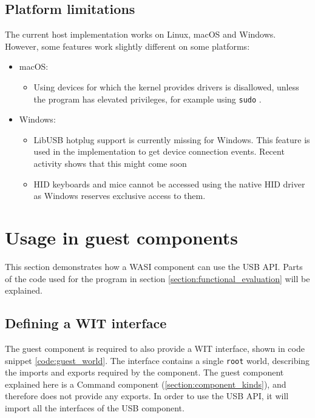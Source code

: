 \subsection{Platform limitations}
\label{section:platform_limitations}
The current host implementation works on Linux, macOS and Windows. However, some features work slightly different on some platforms:

\begin{itemize}
\item macOS: 
\begin{itemize}
\item Using devices for which the kernel provides drivers is disallowed, unless the program has elevated privileges, for example using \texttt{sudo} \cite{libusb_macos_limitations}.
\end{itemize}

\item Windows:
\begin{itemize}
\item LibUSB hotplug support is currently missing for Windows. This feature is used in the implementation to get device connection events. Recent activity shows that this might come soon \cite{libusb_hotplug_support}
\item HID keyboards and mice cannot be accessed using the native HID driver as Windows reserves exclusive access to them. \cite{libusb_windows_limitations}
\end{itemize}
\end{itemize}

\section{Usage in guest components}
This section demonstrates how a \acrshort{WASI} component can use the \acrshort{USB} \acrshort{API}. Parts of the code used for the program in section \ref{section:functional_evaluation} will be explained.

\subsection{Defining a \acrshort{WIT} interface}
The guest component is required to also provide a \acrshort{WIT} interface, shown in code snippet \ref{code:guest_world}. The interface contains a single \texttt{root} world, describing the imports and exports required by the component. The guest component explained here is a Command component (\ref{section:component_kinds}), and therefore does not provide any exports. In order to use the \acrshort{USB} \acrshort{API}, it will import all the interfaces of the \acrshort{USB} component.\\

